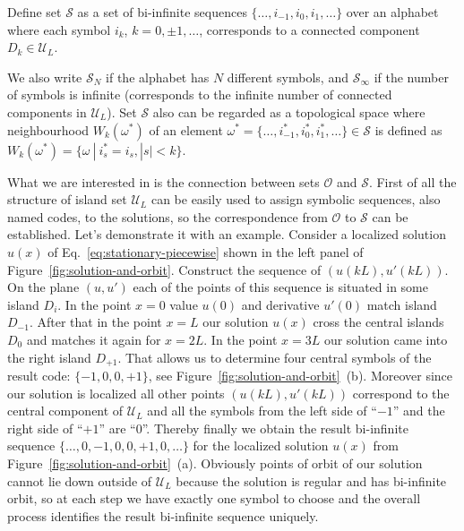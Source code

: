 \begin{definition}
	Define set $\mathcal{S}$ as a set of bi-infinite sequences $\{ \dots, i_{-1}, i_0, i_1, \dots \}$ over an alphabet where each symbol $i_k$, $k = 0, \pm 1, \dots$, corresponds to a connected component $D_k \in \mathscr{U}_L$.
\end{definition}

We also write $\mathcal{S}_N$ if the alphabet has $N$ different symbols, and $\mathcal{S}_{\infty}$ if the number of symbols is infinite (corresponds to the infinite number of connected components in $\mathscr{U}_L$).
Set $\mathcal{S}$ also can be regarded as a topological space where neighbourhood $W_k(\omega^*)$ of an element $\omega^* = \{ \dots, i_{-1}^*, i_0^*, i_1^*, \dots \} \in \mathcal{S}$ is defined as $W_k(\omega^*) = \{ \omega \ | \ i_s^* = i_s, |s| < k \}$.

What we are interested in is the connection between sets $\mathcal{O}$ and $\mathcal{S}$.
First of all the structure of island set $\mathscr{U}_L$ can be easily used to assign symbolic sequences, also named codes, to the solutions, so the correspondence from $\mathcal{O}$ to $\mathcal{S}$ can be established.
Let's demonstrate it with an example.
Consider a localized solution $u(x)$ of Eq.~\eqref{eq:stationary-piecewise} shown in the left panel of Figure~\ref{fig:solution-and-orbit}.
Construct the sequence of $(u(kL), u'(kL))$.
On the plane $(u, u')$ each of the points of this sequence is situated in some island $D_i$.
In the point $x = 0$ value $u(0)$ and derivative $u'(0)$ match island $D_{-1}$.
After that in the point $x = L$ our solution $u(x)$ cross the central islands $D_0$ and matches it again for $x = 2L$.
In the point $x = 3L$ our solution came into the right island $D_{+1}$.
That allows us to determine four central symbols of the result code: $\{ -1, 0, 0, +1 \}$, see Figure~\ref{fig:solution-and-orbit}~(b).
Moreover since our solution is localized all other points $(u(kL), u'(kL))$ correspond to the central component of $\mathscr{U}_L$ and all the symbols from the left side of ``$-1$'' and the right side of ``$+1$'' are ``$0$''.
Thereby finally we obtain the result bi-infinite sequence $\{ \dots, 0, -1, 0, 0, +1, 0, \dots \}$ for the localized solution $u(x)$ from Figure~\ref{fig:solution-and-orbit}~(a).
Obviously points of orbit of our solution cannot lie down outside of  $\mathscr{U}_L$ because the solution is regular and has bi-infinite orbit, so at each step we have exactly one symbol to choose and the overall process identifies the result bi-infinite sequence uniquely.

